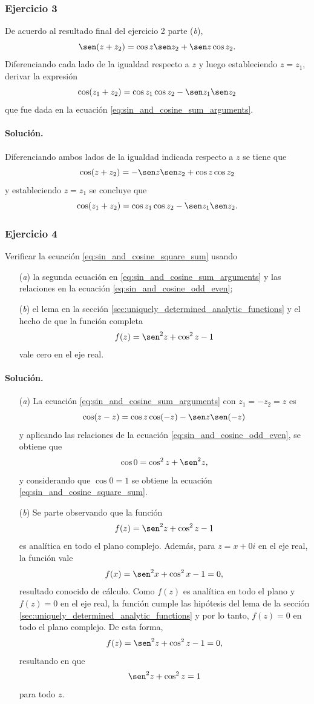 \documentclass[a4paper]{report}
\begin{document}
\subsubsection{Ejercicio 3}

De acuerdo al resultado final del ejercicio 2 parte (\textit{b}),
\[
 \sen(z+z_2)=\cos z\sen z_2+\sen z\cos z_2.
\]
Diferenciando cada lado de la igualdad respecto a \(z\) y luego estableciendo \(z=z_1\), derivar la expresión 
\[
 \cos(z_1+z_2)=\cos z_1\cos z_2-\sen z_1\sen z_2
\]
que fue dada en la ecuación \ref{eq:sin_and_cosine_sum_arguments}.

\paragraph{Solución.} Diferenciando ambos lados de la igualdad indicada respecto a \(z\) se tiene que 
\[
 \cos(z+z_2)=-\sen z\sen z_2+\cos z\cos z_2
\]
y estableciendo \(z=z_1\) se concluye que 
\[
 \cos(z_1+z_2)=\cos z_1\cos z_2-\sen z_1\sen z_2.
\]

\subsubsection{Ejercicio 4}

Verificar la ecuación \ref{eq:sin_and_cosine_square_sum} usando
\begin{enumerate}
 \item[(\textit{a})] la segunda ecuación en \ref{eq:sin_and_cosine_sum_arguments} y las relaciones en la ecuación \ref{eq:sin_and_cosine_odd_even};
 \item[(\textit{b})] el lema en la sección \ref{sec:uniquely_determined_analytic_functions} y el hecho de que la función completa
 \[
  f(z)=\sen^2z+\cos^2z-1
 \]
 vale cero en el eje real.
\end{enumerate}

\paragraph{Solución.} 

\begin{enumerate}
 \item[(\textit{a})] La ecuación \ref{eq:sin_and_cosine_sum_arguments} con \(z_1=-z_2=z\) es 
 \[
  \cos(z-z)=\cos z\cos(-z)-\sen z\sen(-z)
 \]
 y aplicando las relaciones de la ecuación \ref{eq:sin_and_cosine_odd_even}, se obtiene que 
 \[
  \cos0=\cos^2z+\sen^2z,
 \]
 y considerando que \(\cos0=1\) se obtiene la ecuación \ref{eq:sin_and_cosine_square_sum}.
 \item[(\textit{b})] Se parte observando que la función 
 \[
  f(z)=\sen^2z+\cos^2z-1
 \]
 es analítica en todo el plano complejo. Además, para \(z=x+0i\) en el eje real, la función vale
 \[
  f(x)=\sen^2x+\cos^2x-1=0,
 \]
 resultado conocido de cálculo. Como \(f(z)\) es analítica en todo el plano y \(f(z)=0\) en el eje real, la función cumple las hipótesis del lema de la sección \ref{sec:uniquely_determined_analytic_functions} y por lo tanto, \(f(z)=0\) en todo el plano complejo. De esta forma,
 \[
  f(z)=\sen^2z+\cos^2z-1=0,
 \]
 resultando en que 
 \[
  \sen^2z+\cos^2z=1
 \]
 para todo \(z\).
\end{enumerate}
\end{document}
